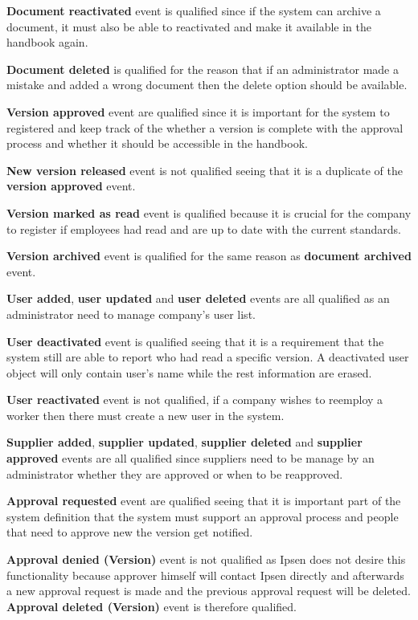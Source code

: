 \textbf{Document reactivated} event is qualified since if the system can archive a document, it must also be able to reactivated and make it available in the handbook again. 

\textbf{Document deleted} is qualified for the reason that if an administrator made a mistake and added a wrong document then the delete option should be available. 

\textbf{Version approved} event are qualified since it is important for the system to registered and keep track of the whether a version is complete with the approval process and whether it should be accessible in the handbook. 

\textbf{New version released} event is not qualified seeing that it is a duplicate of the \textbf{version approved} event. 

\textbf{Version marked as read} event is qualified because it is crucial for the company to register if employees had read and are up to date with the current standards. 

\textbf{Version archived} event is qualified for the same reason as \textbf{document archived} event.

\textbf{User added}, \textbf{user updated} and \textbf{user deleted} events are all qualified as an administrator need to manage company's user list. 

\textbf{User deactivated} event is qualified seeing that it is a requirement that the system still are able to report who had read a specific version. A deactivated user object will only contain user's name while the rest information are erased. 

\textbf{User reactivated} event is not qualified, if a company wishes to reemploy a worker then there must create a new user in the system. 


\textbf{Supplier added}, \textbf{supplier updated},  \textbf{supplier deleted} and \textbf{supplier approved} events are all qualified since suppliers need to be manage by an administrator whether they are approved or when to be reapproved. 

\textbf{Approval requested} event are qualified seeing that it is important part of the system definition that the system must support an approval process and people that need to approve new the version get notified. 

 \textbf{Approval denied (Version)} event is not qualified as Ipsen does not desire this functionality because approver himself will contact Ipsen directly and afterwards a new approval request is made and the previous approval request will be deleted. \textbf{Approval deleted (Version)} event is therefore qualified.

